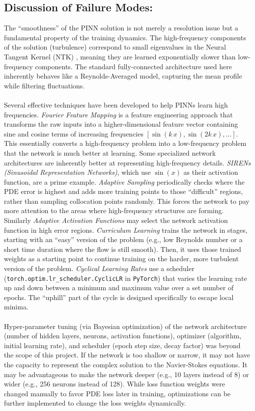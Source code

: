\documentclass{homework}
\begin{document}
\subsection*{Discussion of Failure Modes: \qquad}
The ``smoothness'' of the PINN solution is not merely a resolution issue but a fundamental property of the training dynamics. The high-frequency components of the solution (turbulence) correspond to small eigenvalues in the Neural Tangent Kernel (NTK) \cite{Rahaman2019,LUO2021}, meaning they are learned exponentially slower than low-frequency components. The standard fully-connected architecture used here inherently behaves like a Reynolds-Averaged model, capturing the mean profile while filtering fluctuations.
\\ \\
Several effective techniques have been developed to help PINNs learn high frequencies. \emph{Fourier Feature Mapping} \cite{Tancik2020,WANG2021} is a feature engineering approach that transforms the raw inputs into a higher-dimensional feature vector containing sine and cosine terms of increasing frequencies $[\sin(k\,x), \sin(2k\,x),\dots]$. This essentially converts a high-frequency problem into a low-frequency problem that the network is much better at learning. Some specialized network architectures are inherently better at representing high-frequency details. \emph{SIRENs (Sinusoidal Representation Networks)}, which use $\sin(x)$ as their activation function, are a prime example. \emph{Adaptive Sampling} periodically checks where the PDE error is highest and adds more training points to those ``difficult'' regions, rather than sampling collocation points randomly. This forces the network to pay more attention to the areas where high-frequency structures are forming. Similarly \emph{Adaptive Activation Functions} \cite{JAGTAP2020} may select the network activation function in high error regions. \emph{Curriculum Learning} trains the network in stages, starting with an ``easy'' version of the problem (e.g., low Reynolds number or a short time duration where the flow is still smooth). Then, it uses those trained weights as a starting point to continue training on the harder, more turbulent version of the problem. \emph{Cyclical Learning Rates} use a scheduler (\texttt{torch.optim.lr\_scheduler.CyclicLR} in \texttt{PyTorch}) that varies the learning rate up and down between a minimum and maximum value over a set number of epochs. The ``uphill'' part of the cycle is designed specifically to escape local minima.
\\ \\
Hyper-parameter tuning (via Bayesian optimization) of the network architecture (number of hidden layers, neurons, activation functions), optimizer (algorithm, initial learning rate), and scheduler (epoch step size, decay factor) was beyond the scope of this project. If the network is too shallow or narrow, it may not have the capacity to represent the complex solution to the Navier-Stokes equations. It may be advantageous to make the network deeper (e.g., 10 layers instead of 8) or wider (e.g., 256 neurons instead of 128). While loss function weights were changed manually to favor PDE loss later in training, optimizations can be further implemented to change the loss weights dynamically. 
\end{document}
